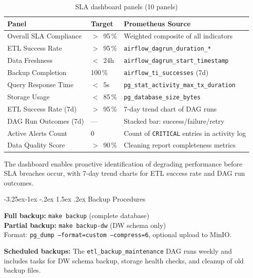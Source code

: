 \documentclass[a4paper,11pt,oneside,openany]{report}
\makeatletter
\renewcommand\subsection{\@startsection{subsection}{2}{\z@}%
  {-3.25ex\@plus -1ex \@minus -.2ex}%
  {1.5ex \@plus .2ex}%
  {\normalfont\large\bfseries\color{ntdarkgreen}}}
\makeatother
\begin{document}
\begin{table}[H]
\centering
\caption{SLA dashboard panels (10 panels)}
\label{tab:sla-dashboard}
\begin{tabularx}{\textwidth}{L{4cm} C{2cm} L{6.5cm}}
\toprule
\textbf{Panel} & \textbf{Target} & \textbf{Prometheus Source} \\
\midrule
Overall SLA Compliance & $>$~95\,\% & Weighted composite of all indicators \\
ETL Success Rate & $>$~95\,\% & \texttt{airflow\_dagrun\_duration\_*} \\
Data Freshness & $<$~24h & \texttt{airflow\_dagrun\_start\_timestamp} \\
Backup Completion & 100\,\% & \texttt{airflow\_ti\_successes} (7d) \\
Query Response Time & $<$~5s & \texttt{pg\_stat\_activity\_max\_tx\_duration} \\
Storage Usage & $<$~85\,\% & \texttt{pg\_database\_size\_bytes} \\
ETL Success Rate (7d) & $>$~95\,\% & 7-day trend chart of DAG runs \\
DAG Run Outcomes (7d) & --- & Stacked bar: success/failure/retry \\
Active Alerts Count & 0 & Count of \texttt{CRITICAL} entries in activity log \\
Data Quality Score & $>$~90\,\% & Cleaning report completeness metrics \\
\bottomrule
\end{tabularx}
\end{table}

The dashboard enables proactive identification of degrading performance
before SLA breaches occur, with 7-day trend charts for ETL success rate
and DAG run outcomes.

\subsection{Backup Procedures}

\textbf{Full backup:} \texttt{make backup} (complete database)\\
\textbf{Partial backup:} \texttt{make backup-dw} (DW schema only)\\
Format: \texttt{pg\_dump --format=custom --compress=6}, optional upload
to MinIO.

\textbf{Scheduled backups:} The \texttt{etl\_backup\_maintenance} DAG
runs weekly and includes tasks for DW schema backup, storage health
checks, and cleanup of old backup files.
\end{document}
